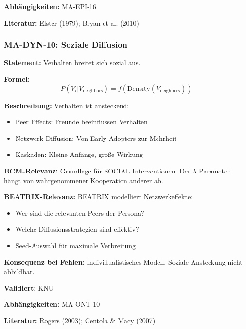 \textbf{Abhängigkeiten:} MA-EPI-16

\textbf{Literatur:} Elster (1979); Bryan et al. (2010)


\subsubsection*{MA-DYN-10: Soziale Diffusion}

\textbf{Statement:} Verhalten breitet sich sozial aus.

\textbf{Formel:}
\begin{equation}
P(V_i|V_{\text{neighbors}}) = f(\text{Density}(V_{\text{neighbors}}))
\end{equation}

\textbf{Beschreibung:}
Verhalten ist ansteckend:
\begin{itemize}
    \item Peer Effects: Freunde beeinflussen Verhalten
    \item Netzwerk-Diffusion: Von Early Adopters zur Mehrheit
    \item Kaskaden: Kleine Anfänge, große Wirkung
\end{itemize}

\textbf{BCM-Relevanz:}
Grundlage für SOCIAL-Interventionen. Der $\lambda$-Parameter hängt von wahrgenommener Kooperation anderer ab.

\textbf{BEATRIX-Relevanz:}
BEATRIX modelliert Netzwerkeffekte:
\begin{itemize}
    \item Wer sind die relevanten Peers der Persona?
    \item Welche Diffusionsstrategien sind effektiv?
    \item Seed-Auswahl für maximale Verbreitung
\end{itemize}

\textbf{Konsequenz bei Fehlen:}
Individualistisches Modell. Soziale Ansteckung nicht abbildbar.

\textbf{Validiert:} KNU

\textbf{Abhängigkeiten:} MA-ONT-10

\textbf{Literatur:} Rogers (2003); Centola \& Macy (2007)


